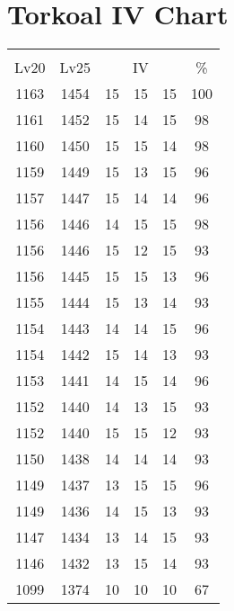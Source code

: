 \documentclass{article}%
\begin{document}
%
\normalsize%
\section{Torkoal IV Chart}%
\label{sec:Torkoal IV Chart}%
\renewcommand{\arraystretch}{1.5}%
\begin{tabular}{|c|c|c|c|c|c|}%
\hline%
\multicolumn{6}{|c|}{\textcolor{white}{ 
\linebreak{Torkoal}
}%
\cellcolor{black}}\\%
\multicolumn{1}{|c}{Lv20}&\multicolumn{1}{c|}{Lv25}&\multicolumn{3}{c|}{IV}&\multicolumn{1}{|c|}{\%}\\%
\hline%
\rowcolor{color100}%
1163&1454&15&15&15&100\\%
\hline%
\rowcolor{color98}%
1161&1452&15&14&15&98\\%
\hline%
\rowcolor{color98}%
1160&1450&15&15&14&98\\%
\hline%
\rowcolor{color96}%
1159&1449&15&13&15&96\\%
\hline%
\rowcolor{color96}%
1157&1447&15&14&14&96\\%
\hline%
\rowcolor{color98}%
1156&1446&14&15&15&98\\%
\hline%
\rowcolor{color93}%
1156&1446&15&12&15&93\\%
\hline%
\rowcolor{color96}%
1156&1445&15&15&13&96\\%
\hline%
\rowcolor{color93}%
1155&1444&15&13&14&93\\%
\hline%
\rowcolor{color96}%
1154&1443&14&14&15&96\\%
\hline%
\rowcolor{color93}%
1154&1442&15&14&13&93\\%
\hline%
\rowcolor{color96}%
1153&1441&14&15&14&96\\%
\hline%
\rowcolor{color93}%
1152&1440&14&13&15&93\\%
\hline%
\rowcolor{color93}%
1152&1440&15&15&12&93\\%
\hline%
\rowcolor{color93}%
1150&1438&14&14&14&93\\%
\hline%
\rowcolor{color96}%
1149&1437&13&15&15&96\\%
\hline%
\rowcolor{color93}%
1149&1436&14&15&13&93\\%
\hline%
\rowcolor{color93}%
1147&1434&13&14&15&93\\%
\hline%
\rowcolor{color93}%
1146&1432&13&15&14&93\\%
\hline%
\rowcolor{color91}%
1099&1374&10&10&10&67\\%
\end{tabular}

%
\end{document}
